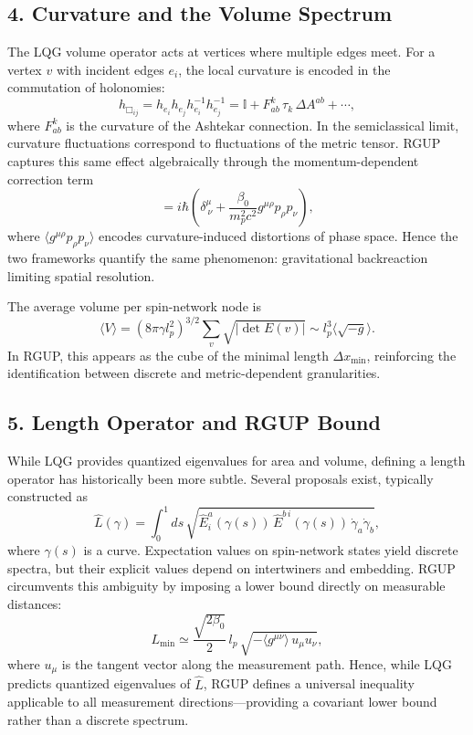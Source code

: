 \documentclass[11pt,oneside]{book}
\numberwithin{equation}{chapter}
\begin{document}
\subsection*{4. Curvature and the Volume Spectrum}

The LQG volume operator acts at vertices where multiple edges meet.  
For a vertex $v$ with incident edges $e_i$, the local curvature is encoded in the commutation of holonomies:
\begin{equation}
h_{\Box_{ij}} = h_{e_i}h_{e_j}h_{e_i}^{-1}h_{e_j}^{-1}
= \mathbb{I} + F_{ab}^k\,\tau_k\,\Delta A^{ab} + \cdots,
\end{equation}
where $F_{ab}^k$ is the curvature of the Ashtekar connection.  
In the semiclassical limit, curvature fluctuations correspond to fluctuations of the metric tensor.  
RGUP captures this same effect algebraically through the momentum-dependent correction term
\begin{equation}
[x^\mu,p_\nu] = i\hbar
\left(
\delta^\mu_{\ \nu}
+ \frac{\beta_0}{m_p^2 c^2}
g^{\mu\rho}p_\rho p_\nu
\right),
\end{equation}
where $\langle g^{\mu\rho}p_\rho p_\nu\rangle$ encodes curvature-induced distortions of phase space.  
Hence the two frameworks quantify the same phenomenon: gravitational backreaction limiting spatial resolution.

The average volume per spin-network node is
\begin{equation}
\langle V\rangle = 
(8\pi\gamma l_p^2)^{3/2}
\sum_{v}\sqrt{|\det E(v)|}
\sim l_p^3 \langle \sqrt{-g}\rangle.
\end{equation}
In RGUP, this appears as the cube of the minimal length $\Delta x_{\min}$, reinforcing the identification between discrete and metric-dependent granularities.

\subsection*{5. Length Operator and RGUP Bound}

While LQG provides quantized eigenvalues for area and volume, defining a length operator has historically been more subtle.  
Several proposals exist, typically constructed as
\begin{equation}
\hat{L}(\gamma) =
\int_0^1 ds \,
\sqrt{ \hat{E}^a_i(\gamma(s))\,\hat{E}^{b\,i}(\gamma(s))
\,\dot{\gamma}_a \dot{\gamma}_b },
\end{equation}
where $\gamma(s)$ is a curve.  
Expectation values on spin-network states yield discrete spectra, but their explicit values depend on intertwiners and embedding.  
RGUP circumvents this ambiguity by imposing a lower bound directly on measurable distances:
\begin{equation}
L_{\min} \simeq 
\frac{\sqrt{2\beta_0}}{2}\,l_p\,
\sqrt{-\langle g^{\mu\nu}\rangle\,u_\mu u_\nu},
\end{equation}
where $u_\mu$ is the tangent vector along the measurement path.  
Hence, while LQG predicts quantized eigenvalues of $\hat{L}$, RGUP defines a universal inequality applicable to all measurement directions—providing a covariant lower bound rather than a discrete spectrum.
\end{document}
